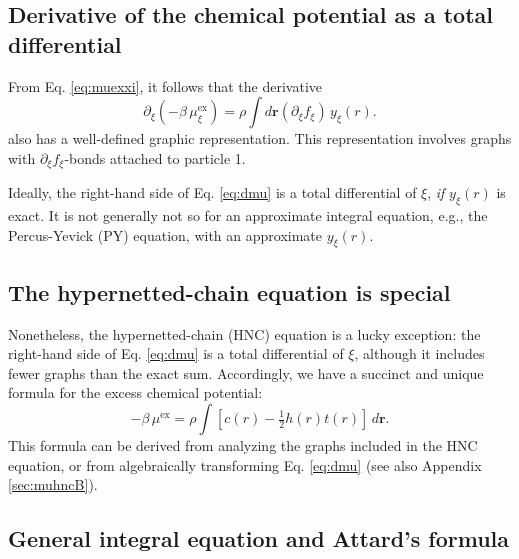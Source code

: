 \documentclass[notitlepage, preprint]{revtex4-1}
\newcommand{\vct}[1]{\mathbf{#1}}
\providecommand{\vr}{} %
\renewcommand{\vr}{\vct{r}}
\newcommand{\supex}[1]{ { { #1 }^{ \mathrm{ex} } } }
\newcommand{\muex}{\supex{\mu}}
\newcommand{\muexxi}{\mu^{ \mathrm{ex} }_\xi}
\begin{document}
\subsection{Derivative of the chemical potential as a total differential}



From Eq. \eqref{eq:muexxi}, it follows that the derivative
\begin{equation}
  \partial_\xi (-\beta \, \muexxi)
  = \rho \int d\vr (\partial_\xi f_\xi) \, y_\xi(r).
\label{eq:dmu}
\end{equation}
also has a well-defined graphic representation.
%
This representation involves graphs with $\partial_\xi f_\xi$-bonds
attached to particle 1.

Ideally, the right-hand side of Eq. \eqref{eq:dmu}
is a total differential of $\xi$,
%
\emph{if} $y_\xi(r)$ is exact.
%
It is not generally not so for an approximate integral equation,
e.g., the Percus-Yevick (PY) equation\cite{percusyevick},
with an approximate $y_\xi(r)$.





\subsection{The hypernetted-chain equation is special}



Nonetheless,
  the hypernetted-chain (HNC) equation\cite{
  morita1958, morita1959, morita1960, vanleeuwen1959, green1960, verlet1960, rushbrooke1960}
  is a lucky exception:
the right-hand side of Eq. \eqref{eq:dmu} is a total differential of $\xi$,
  although it includes fewer graphs than the exact sum.
%
Accordingly,
we have a succinct and unique formula\cite{morita1960, singer1985}
for the excess chemical potential:
\begin{equation}
  -\beta \, \muex
=
  \rho \int
  \left[ c(r) - \tfrac{1}{2} h(r) t(r) \right] \, d\vr.
\label{eq:muhnc}
\end{equation}
%
This formula can be derived
from analyzing the graphs included in the HNC equation\cite{morita1960},
%
or from algebraically transforming Eq. \eqref{eq:dmu}\cite{singer1985}
(see also Appendix \ref{sec:muhncB}).
%





\subsection{General integral equation and Attard's formula}
\end{document}
